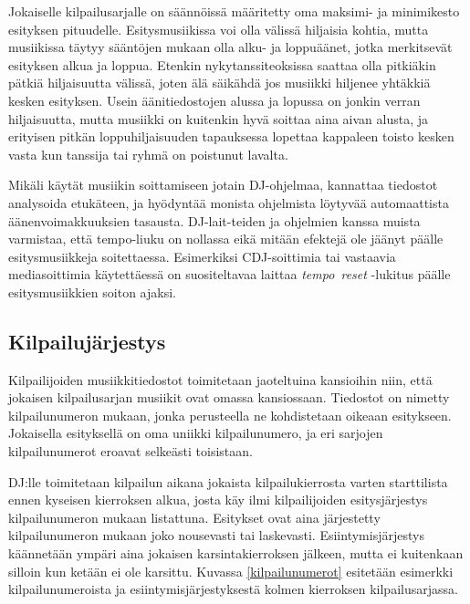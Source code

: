 \documentclass[12pt, a4paper, oneside]{article}
\begin{document}
Jokaiselle kilpailusarjalle on säännöissä määritetty oma maksimi- ja minimikesto esityksen pituudelle. Esitysmusiikissa voi olla välissä hiljaisia kohtia, mutta musiikissa täytyy sääntöjen mukaan olla alku- ja loppuäänet, jotka merkitsevät esityksen alkua ja loppua. Etenkin nykytanssiteoksissa saattaa olla pitkiäkin pätkiä hiljaisuutta välissä, joten älä säikähdä jos musiikki hiljenee yhtäkkiä kesken esityksen. Usein äänitiedostojen alussa ja lopussa on jonkin verran hiljaisuutta, mutta musiikki on kuitenkin hyvä soittaa aina aivan alusta, ja erityisen pitkän loppuhiljaisuuden tapauksessa lopettaa kappaleen toisto kesken vasta kun tanssija tai ryhmä on poistunut lavalta.

Mikäli käytät musiikin soittamiseen jotain DJ-ohjelmaa, kannattaa tiedostot analysoida etukäteen, ja hyödyntää monista ohjelmista löytyvää automaattista äänenvoimakkuuksien tasausta. DJ-lait-teiden ja ohjelmien kanssa muista varmistaa, että tempo-liuku on nollassa eikä mitään efektejä ole jäänyt päälle esitysmusiikkeja soitettaessa. Esimerkiksi CDJ-soittimia tai vastaavia mediasoittimia käytettäessä on suositeltavaa laittaa \textit{tempo~reset} -lukitus päälle esitysmusiikkien soiton ajaksi.

\subsection{Kilpailujärjestys}

Kilpailijoiden musiikkitiedostot toimitetaan jaoteltuina kansioihin niin, että jokaisen kilpailusarjan musiikit ovat omassa kansiossaan. Tiedostot on nimetty kilpailunumeron mukaan, jonka perusteella ne kohdistetaan oikeaan esitykseen. Jokaisella esityksellä on oma uniikki kilpailunumero, ja eri sarjojen kilpailunumerot eroavat selkeästi toisistaan.

DJ:lle toimitetaan kilpailun aikana jokaista kilpailukierrosta varten starttilista ennen kyseisen kierroksen alkua, josta käy ilmi kilpailijoiden esitysjärjestys kilpailunumeron mukaan listattuna. Esitykset ovat aina järjestetty kilpailunumeron mukaan joko nousevasti tai laskevasti. Esiintymisjärjestys käännetään ympäri aina jokaisen karsintakierroksen jälkeen, mutta ei kuitenkaan silloin kun ketään ei ole karsittu. Kuvassa \ref{kilpailunumerot} esitetään esimerkki kilpailunumeroista ja esiintymisjärjestyksestä kolmen kierroksen kilpailusarjassa.
\end{document}
